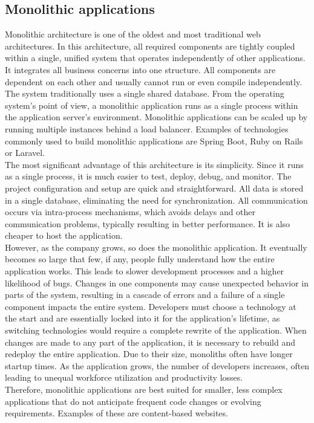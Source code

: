 \subsection{Monolithic applications}
Monolithic architecture is one of the oldest and most traditional web architectures. In this architecture, all required components are tightly coupled within a single, unified system that operates independently of other applications. It integrates all business concerns into one structure. All components are dependent on each other and usually cannot run or even compile independently. The system traditionally uses a single shared database. From the operating system's point of view, a monolithic application runs as a single process within the application server's environment. Monolithic applications can be scaled up by running multiple instances behind a load balancer. Examples of technologies commonly used to build monolithic applications are Spring Boot, Ruby on Rails or Laravel.\\

\noindent
The most significant advantage of this architecture is its simplicity. Since it runs as a single process, it is much easier to test, deploy, debug, and monitor. The project configuration and setup are quick and straightforward. All data is stored in a single database, eliminating the need for synchronization. All communication occurs via intra-process mechanisms, which avoids delays and other communication problems, typically resulting in better performance. It is also cheaper to host the application. \\

\noindent
However, as the company grows, so does the monolithic application. It eventually becomes so large that few, if any, people fully understand how the entire application works. This leads to slower development processes and a higher likelihood of bugs. Changes in one components may cause unexpected behavior in parts of the system, resulting in a cascade of errors and a failure of a single component impacts the entire system. Developers must choose a technology at the start and are essentially locked into it for the application's lifetime, as switching technologies would require a complete rewrite of the application. When changes are made to any part of the application, it is necessary to rebuild and redeploy the entire application. Due to their size, monoliths often have longer startup times. As the application grows, the number of developers increases, often leading to unequal workforce utilization and productivity losses. \\

\noindent
Therefore, monolithic applications are best suited for smaller, less complex applications that do not anticipate frequent code changes or evolving requirements. Examples of these are content-based websites. \cite{Salaheddin}\cite{Blinowski}